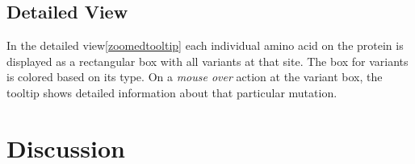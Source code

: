 \documentclass[twoside]{article}
\begin{document}
\begin{multicols}{2}

\subsection{Detailed View}
In the detailed view\ref{zoomedtooltip} each individual amino acid on the protein is displayed as a rectangular box with all variants at that site. The box for variants is colored based on its type. On a \textit{mouse over} action at the variant box, the tooltip shows detailed information about that particular mutation.
















\section{Discussion}


\end{multicols}
\end{document}
